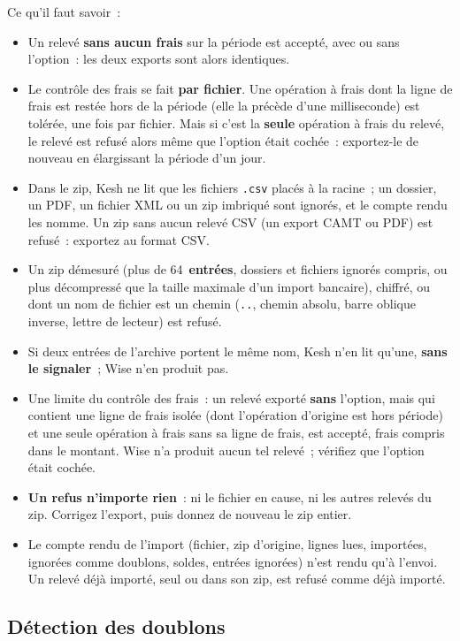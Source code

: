 \documentclass[a4paper,11pt,oneside]{article}
\begin{document}
Ce qu'il faut savoir~:
\begin{itemize}
    \item Un relevé \textbf{sans aucun frais} sur la période est accepté, avec ou sans l'option~: les deux exports sont alors identiques.
    \item Le contrôle des frais se fait \textbf{par fichier}. Une opération à frais dont la ligne de frais est restée hors de la période (elle la précède d'une milliseconde) est tolérée, une fois par fichier. Mais si c'est la \textbf{seule} opération à frais du relevé, le relevé est refusé alors même que l'option était cochée~: exportez-le de nouveau en élargissant la période d'un jour.
    \item Dans le zip, Kesh ne lit que les fichiers \texttt{.csv} placés à la racine~; un dossier, un PDF, un fichier XML ou un zip imbriqué sont ignorés, et le compte rendu les nomme. Un zip sans aucun relevé CSV (un export CAMT ou PDF) est refusé~: exportez au format CSV.
    \item Un zip démesuré (plus de 64~\textbf{entrées}, dossiers et fichiers ignorés compris, ou plus décompressé que la taille maximale d'un import bancaire), chiffré, ou dont un nom de fichier est un chemin (\texttt{..}, chemin absolu, barre oblique inverse, lettre de lecteur) est refusé.
    \item Si deux entrées de l'archive portent le même nom, Kesh n'en lit qu'une, \textbf{sans le signaler}~; Wise n'en produit pas.
    \item Une limite du contrôle des frais~: un relevé exporté \textbf{sans} l'option, mais qui contient une ligne de frais isolée (dont l'opération d'origine est hors période) et une seule opération à frais sans sa ligne de frais, est accepté, frais compris dans le montant. Wise n'a produit aucun tel relevé~; vérifiez que l'option était cochée.
    \item \textbf{Un refus n'importe rien}~: ni le fichier en cause, ni les autres relevés du zip. Corrigez l'export, puis donnez de nouveau le zip entier.
    \item Le compte rendu de l'import (fichier, zip d'origine, lignes lues, importées, ignorées comme doublons, soldes, entrées ignorées) n'est rendu qu'à l'envoi. Un relevé déjà importé, seul ou dans son zip, est refusé comme déjà importé.
\end{itemize}

\subsection{Détection des doublons}\label{sec:doublons-kesh}
\end{document}
